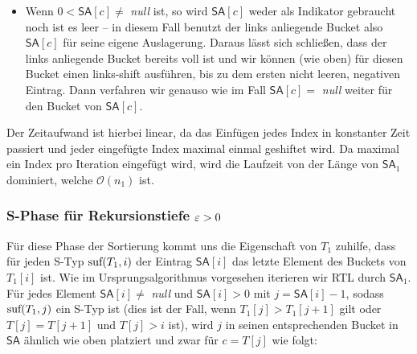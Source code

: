 \begin{itemize}
\item Wenn $ 0 < \mathsf{SA}[c] \neq$ \textit{null} ist, so wird $\mathsf{SA}[c]$ weder als Indikator gebraucht noch ist es leer -- in diesem Fall benutzt der links anliegende Bucket also $\mathsf{SA}[c]$ für seine eigene Auslagerung. Daraus lässt sich schließen, dass der links anliegende Bucket bereits voll ist und wir können (wie oben) für diesen Bucket einen links-shift ausführen, bis zu dem ersten nicht leeren, negativen Eintrag. Dann verfahren wir genauso wie im Fall $\mathsf{SA}[c] = $ \textit{null} weiter für den Bucket von $\mathsf{SA}[c]$.
\end{itemize}

Der Zeitaufwand ist hierbei linear, da das Einfügen jedes Index in konstanter Zeit passiert und jeder eingefügte Index maximal einmal geshiftet wird. Da maximal ein Index pro Iteration eingefügt wird, wird die Laufzeit von der Länge von $\mathsf{SA}_1$ dominiert, welche $\mathcal O(n_1)$ ist.

\subsubsection{ S-Phase für Rekursionstiefe $\varepsilon > 0$}

Für diese Phase der Sortierung kommt uns die Eigenschaft von $T_1$ zuhilfe, dass für jeden S-Typ $\text{suf}(T_1, i)$ der Eintrag $\mathsf{SA}[i]$ das letzte Element des Buckets von $T_1[i]$ ist. Wie im Ursprungsalgorithmus vorgesehen iterieren wir RTL durch $\mathsf{SA}_1$. Für jedes Element $\mathsf{SA}[i] \neq $ \textit{null} und $\mathsf{SA}[i] > 0$ mit $j = \mathsf{SA}[i] -1$, sodass $\text{suf}(T_1,j)$ ein S-Typ ist (dies ist der Fall, wenn $T_1[j] > T_1[j+1]$ gilt oder $T[j] = T[j+1]$ und $T[j] > i$ ist), wird $j$ in seinen entsprechenden Bucket in $\mathsf{SA}$ ähnlich wie oben platziert und zwar für $c = T[j]$ wie folgt:

